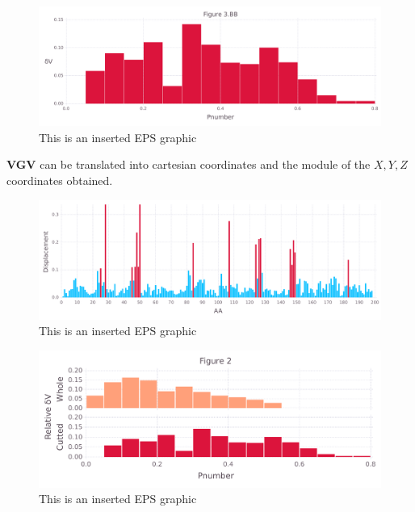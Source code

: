 \documentclass[10pt,letterpaper]{article}
\begin{document}
\begin{figure}[ht]
\begin{center}
\includegraphics[scale=0.5]{1hvr_hol/3bbfigure_hi-precision.pdf}
\caption{This is an inserted EPS graphic}
\label{fig11}
\end{center}
\end{figure}

\FloatBarrier


\textbf{VGV} can be translated into cartesian coordinates and the module of the \(X, Y, Z\) coordinates obtained.

\begin{figure}[ht]
\begin{center}
\includegraphics[scale=0.5]{1hvr_hol/5figure_hi-precision.pdf}
\caption{This is an inserted EPS graphic}
\label{fig13}
\end{center}
\end{figure}

\begin{figure}[ht]
\begin{center}
\includegraphics[scale=0.5]{1hvr_hol/3both_figure_hi-precision.pdf}
\caption{This is an inserted EPS graphic}
\label{fig13}
\end{center}
\end{figure}
\end{document}
